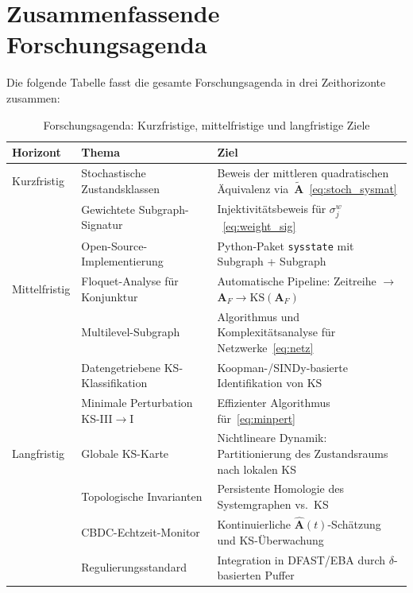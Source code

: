 ﻿\documentclass[12pt, a4paper, titlepage]{report}
\theoremstyle{definition}
\theoremstyle{remark}
\newcommand{\vA}{\bm{A}}
\newcommand{\KS}{\mathrm{KS}}
\begin{document}
\section{Zusammenfassende Forschungsagenda}
\label{subsec:agenda}

Die folgende Tabelle fasst die gesamte Forschungsagenda in drei Zeithorizonte
zusammen:

\begin{table}[H]
\centering
\caption{Forschungsagenda: Kurzfristige, mittelfristige und langfristige Ziele}
\label{tab:agenda}
\begin{tabular}{>{\raggedright\arraybackslash}p{2.2cm}
                >{\raggedright\arraybackslash}p{5.0cm}
                >{\raggedright\arraybackslash}p{5.0cm}}
\toprule
\textbf{Horizont} & \textbf{Thema} & \textbf{Ziel} \\
\midrule
Kurzfristig & Stochastische Zustandsklassen & Beweis der mittleren quadratischen
  Äquivalenz via~$\tilde{\vA}$~\eqref{eq:stoch_sysmat} \\
 & Gewichtete Subgraph-Signatur & Injektivitätsbeweis für $\sigma_j^w$~\eqref{eq:weight_sig} \\
 & Open-Source-Implementierung & Python-Paket \texttt{sysstate} mit Subgraph + Subgraph \\
\midrule
Mittelfristig & Floquet-Analyse für Konjunktur & Automatische Pipeline: Zeitreihe $\to$
  $\vA_F \to \KS(\vA_F)$ \\
 & Multilevel-Subgraph & Algorithmus und Komplexitätsanalyse für Netzwerke~\eqref{eq:netz} \\
 & Datengetriebene KS-Klassifikation & Koopman-/SINDy-basierte Identifikation von $\KS$ \\
 & Minimale Perturbation KS-III$\to$I & Effizienter Algorithmus für~\eqref{eq:minpert} \\
\midrule
Langfristig & Globale KS-Karte & Nichtlineare Dynamik: Partitionierung des
  Zustandsraums nach lokalen KS \\
 & Topologische Invarianten & Persistente Homologie des Systemgraphen vs.\ KS \\
 & CBDC-Echtzeit-Monitor & Kontinuierliche $\hat{\vA}(t)$-Schätzung und KS-Überwachung \\
 & Regulierungsstandard & Integration in DFAST/EBA durch $\delta$-basierten Puffer \\
\bottomrule
\end{tabular}
\end{table}
\end{document}
